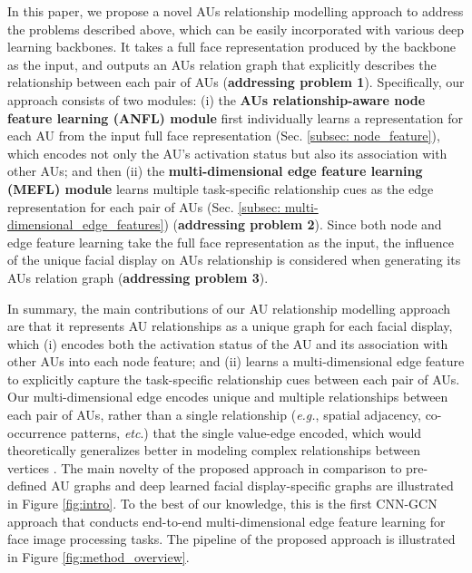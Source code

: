 \documentclass{article}
\begin{document}
In this paper, we propose a novel AUs relationship modelling approach to address the problems described above, which can be easily incorporated with various deep learning backbones. It takes a full face representation produced by the backbone as the input, and outputs an AUs relation graph that explicitly describes the relationship between each pair of AUs (\textbf{addressing problem 1}). Specifically, our approach consists of two modules: (i) the \textbf{AUs relationship-aware node feature learning (ANFL) module} first individually learns a representation for each AU from the input full face representation (Sec. \ref{subsec: node_feature}), which encodes not only the AU's activation status but also its association with other AUs; and then (ii) the \textbf{multi-dimensional edge feature learning (MEFL) module} learns multiple task-specific relationship cues as the edge representation for each pair of AUs (Sec. \ref{subsec: multi-dimensional_edge_features}) (\textbf{addressing problem 2}). Since both node and edge feature learning take the full face representation as the input, the influence of the unique facial display on AUs relationship is considered when generating its AUs relation graph (\textbf{addressing problem 3}). 


In summary, the main contributions of our AU relationship modelling approach are that it represents AU relationships as a unique graph for each facial display, which (i) encodes both the activation status of the AU and its association with other AUs into each node feature; and (ii) learns a multi-dimensional edge feature to explicitly capture the task-specific relationship cues between each pair of AUs. Our multi-dimensional edge encodes unique and multiple relationships between each pair of AUs, rather than a single relationship (\emph{e.g.}, spatial adjacency, co-occurrence patterns, \emph{etc}.) that the single value-edge encoded, which would theoretically generalizes better in modeling complex relationships between vertices \cite{gong2019exploiting,song2021learning,shao2021personality}. The main novelty of the proposed approach in comparison to pre-defined AU graphs \cite{li2019semantic,liu2020relation} and deep learned facial display-specific graphs \cite{song2021uncertain,Song_2021_CVPR} are illustrated in Figure \ref{fig:intro}. To the best of our knowledge, this is the first CNN-GCN approach that conducts end-to-end multi-dimensional edge feature learning for face image processing tasks. The pipeline of the proposed approach is illustrated in Figure \ref{fig:method_overview}. 
\end{document}
